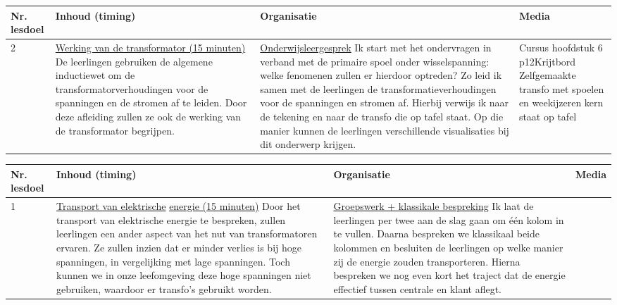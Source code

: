 \begin{landscape}
	\begin{tabularx}{1.56\textwidth}{|p{1.5cm}|p{8cm}|X|p{4cm}|}
		\hline
		\textbf{Nr. lesdoel } & \textbf{Inhoud (timing)}  & \textbf{Organisatie } & \textbf{Media } \\ \hline
		2\newline3\newline4\newline5\newline6&\underline{Werking van de transformator (15 minuten)}\newline
		De leerlingen gebruiken de algemene inductiewet om de transformatorverhoudingen voor de spanningen en de stromen af te leiden. Door deze afleiding zullen ze ook de werking van de transformator begrijpen.
		&  \underline{Onderwijsleergesprek}\newline 
		Ik start  met het ondervragen in verband met de primaire spoel onder wisselspanning: welke fenomenen zullen er hierdoor optreden? Zo leid ik samen met de leerlingen de transformatieverhoudingen voor de spanningen en stromen af. Hierbij verwijs ik naar de tekening en naar de transfo die op tafel staat. Op die manier kunnen de leerlingen verschillende visualisaties bij dit onderwerp krijgen.
		&   Cursus hoofdstuk 6 p12\newline\newline Krijtbord \newline\newline Zelfgemaakte transfo met spoelen en weekijzeren kern staat op tafel
		\\ \hline
	\end{tabularx}\vspace{5mm}

	\begin{tabularx}{1.56\textwidth}{|p{1.5cm}|p{8cm}|X|p{4cm}|}
	\hline
	\textbf{Nr. lesdoel } & \textbf{Inhoud (timing)}  & \textbf{Organisatie } & \textbf{Media } \\ \hline
	1\newline6\newline7\newline8&\underline{Transport van elektrische} \underline{energie (15 minuten)}\newline
	Door het transport van elektrische energie te bespreken, zullen leerlingen een ander aspect van het nut van transformatoren ervaren. Ze zullen inzien dat er minder verlies is bij hoge spanningen, in vergelijking met lage spanningen. Toch kunnen we in onze leefomgeving deze hoge spanningen niet gebruiken, waardoor er transfo's gebruikt worden.
	&  \underline{Groepswerk + klassikale bespreking}\newline 
	Ik laat de leerlingen per twee aan de slag gaan om één kolom in te vullen. Daarna bespreken we klassikaal beide kolommen en besluiten de leerlingen op welke manier zij de energie zouden transporteren. Hierna bespreken we nog even kort het traject dat de energie effectief tussen centrale en klant aflegt.
	

\end{tabularx}
\end{landscape}
